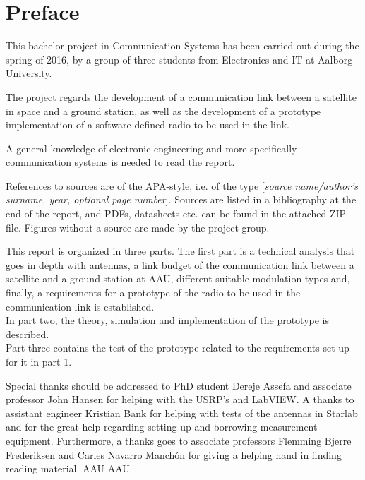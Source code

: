 \chapter*{Preface}\label{ch:forord}%

This bachelor project in Communication Systems has been carried out during the spring of 2016, by a group of three students from Electronics and IT at Aalborg University.

The project regards the development of a communication link between a satellite in space and a ground station, as well as  the development of a prototype implementation of a software defined radio to be used in the link.

A general knowledge of electronic engineering and more specifically communication systems is needed to read the report.  

References to sources are of the APA-style, i.e. of the type [\emph{source name/author's surname, year, optional page number}]. Sources are listed in a bibliography at the end of the report, and PDFs, datasheets etc. can be found in the attached ZIP-file. Figures without a source are made by the project group.%

This report is organized in three parts. The first part is a technical analysis that goes in depth with antennas, a link budget of the communication link between a satellite and a ground station at AAU, different suitable modulation types and, finally, a requirements for a prototype of the radio to be used in the communication link is established. \\ In part two, the theory, simulation and implementation of the prototype is described. \\ Part three contains the test of the prototype related to the requirements set up for it in part 1. %

Special thanks should be addressed to PhD student Dereje Assefa and associate professor John Hansen for helping with the USRP's and LabVIEW. A thanks to assistant engineer Kristian Bank for helping with tests of the antennas in Starlab and for the great help regarding setting up and borrowing measurement equipment. Furthermore, a thanks goes to associate professors Flemming Bjerre Frederiksen and Carles Navarro Manchón for giving a helping hand in finding reading material. \gls{AAU} \gls{AAU}

